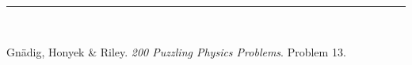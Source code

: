 \documentclass{article}
\begin{document}
\vspace{2mm}

\begin{center}
\noindent\rule{8cm}{0.4pt}\\
\end{center}

\noindent [1] Gn\"adig, Honyek \& Riley. \textit{200 Puzzling Physics Problems}. Problem 13. 
\end{document}
